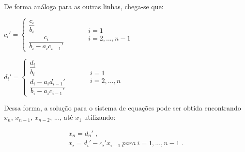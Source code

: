 De forma análoga para as outras linhas, chega-se que:

\begin{center}
	\begin{math}
		c_i' = 
		\left\{
    		\begin{array}{l}
      			\dfrac{c_i}{b_i}  \\
				\dfrac{c_i}{b_i - a_i c_{i-1}'}
			\end{array}
    		\begin{array}{l}
      		\qquad \\
			\qquad \\
			\qquad	   
    		\end{array}
    		\begin{array}{l}
    			i = 1 \\
      			i = 2, ... , n-1
    		\end{array}
		\right.	
	\end{math}
\end{center} 
\begin{center}
	\begin{math}
		d_i' = 
		\left\{
    		\begin{array}{l}
      			\dfrac{d_i}{b_i}  \\
				\dfrac{d_i - a_i d_{i-1}'}{b_i - a_i c_{i-1}'}
			\end{array}
    		\begin{array}{l}
      			\qquad \\
				\qquad \\
				\qquad	   
    		\end{array}
    		\begin{array}{l}
    			i = 1 \\
      			i = 2, ... , n
    		\end{array}
		\right.
	\end{math}
\end{center} 

Dessa forma, a solução para o sistema de equações pode ser obtida encontrando $x_n$, $x_{n-1}$, $x_{n-2}$, ..., até $x_1$ utilizando:

\begin{gather*}
	x_n = d_n' \;,\\
	x_i = d_i' - c_i' x_{i+1} \ para \ i = 1, ..., n-1 \;.
\end{gather*}